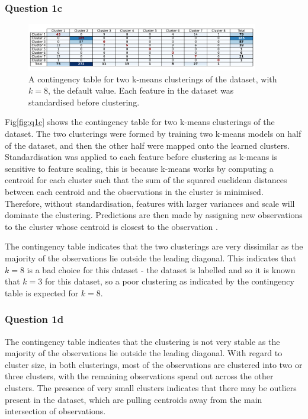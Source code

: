 \subsubsection{Question 1c}\label{subsubsec:q1c}
    \begin{figure}[htb]
    \centering
    \includegraphics[width=0.9\textwidth]{./figures/q1c}
    \caption{A contingency table for two k-means clusterings of the  dataset, with $k=8$,
        the default  value. Each feature in the dataset was standardised before clustering.}
    \label{fig:q1c}
    \end{figure}

    Fig\eqref{fig:q1c} shows the contingency table for two k-means clusterings of the dataset.
    The two clusterings were formed by training two k-means models on half of the dataset, and then the other half were
    mapped onto the learned clusters.
    Standardisation was applied to each feature before clustering as k-means is sensitive to feature scaling, this is because
    k-means works by computing a centroid for each cluster such that the sum of the squared euclidean distances between
    each centroid and the observations in the cluster is minimised.
    Therefore, without standardisation, features with larger variances and scale will dominate the clustering.
    Predictions are then made by assigning new observations to the cluster whose centroid is closest to the
    observation \cite{sklearn-k-means}.

    The contingency table indicates that the two clusterings are very dissimilar as the majority of the observations
    lie outside the leading diagonal.
    This indicates that $k=8$ is a bad choice for this dataset - the dataset is labelled and so it is known
    that $k=3$ for this dataset, so a poor clustering as indicated by the contingency table is expected for $k=8$.

\subsubsection{Question 1d}\label{subsubsec:q1d}
    The contingency table indicates that the clustering is not very stable as the majority of the observations lie
    outside the leading diagonal.
    With regard to cluster size, in both clusterings, most of the observations are clustered into two or three clusters,
    with the remaining observations spead out across the other clusters.
    The presence of very small clusters indicates that there may be outliers present in the dataset, which are pulling
    centroids away from the main intersection of observations.
